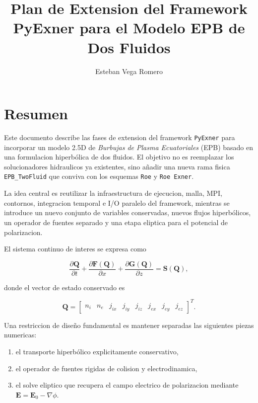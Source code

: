 \documentclass[11pt]{article}
\title{Plan de Extension del Framework PyExner para el Modelo EPB de Dos Fluidos}
\author{Esteban Vega Romero}
\begin{document}
\maketitle

\section*{Resumen}

Este documento describe las fases de extension del framework \texttt{PyExner} para incorporar un modelo 2.5D de \emph{Burbujas de Plasma Ecuatoriales} (EPB) basado en una formulacion hiperb\'olica de dos fluidos. El objetivo no es reemplazar los solucionadores hidraulicos ya existentes, sino a\~nadir una nueva rama fisica \texttt{EPB\_TwoFluid} que conviva con los esquemas \texttt{Roe} y \texttt{Roe Exner}.

La idea central es reutilizar la infraestructura de ejecucion, malla, MPI, contornos, integracion temporal e I/O paralelo del framework, mientras se introduce un nuevo conjunto de variables conservadas, nuevos flujos hiperb\'olicos, un operador de fuentes separado y una etapa eliptica para el potencial de polarizacion.

El sistema continuo de interes se expresa como

\begin{equation}
\frac{\partial \mathbf{Q}}{\partial t}
+ \frac{\partial \mathbf{F}(\mathbf{Q})}{\partial x}
+ \frac{\partial \mathbf{G}(\mathbf{Q})}{\partial z}
= \mathbf{S}(\mathbf{Q}),
\end{equation}

donde el vector de estado conservado es

\begin{equation}
\mathbf{Q} =
\begin{bmatrix}
n_i & n_e & j_{ix} & j_{iy} & j_{iz} & j_{ex} & j_{ey} & j_{ez}
\end{bmatrix}^{T}.
\end{equation}

Una restriccion de dise\~no fundamental es mantener separadas las siguientes piezas numericas:

\begin{enumerate}[label=\arabic*.]
    \item el transporte hiperb\'olico explicitamente conservativo,
    \item el operador de fuentes rigidas de colision y electrodinamica,
    \item el solve eliptico que recupera el campo electrico de polarizacion mediante $\mathbf{E} = \mathbf{E}_0 - \nabla \phi$.
\end{enumerate}
\end{document}
